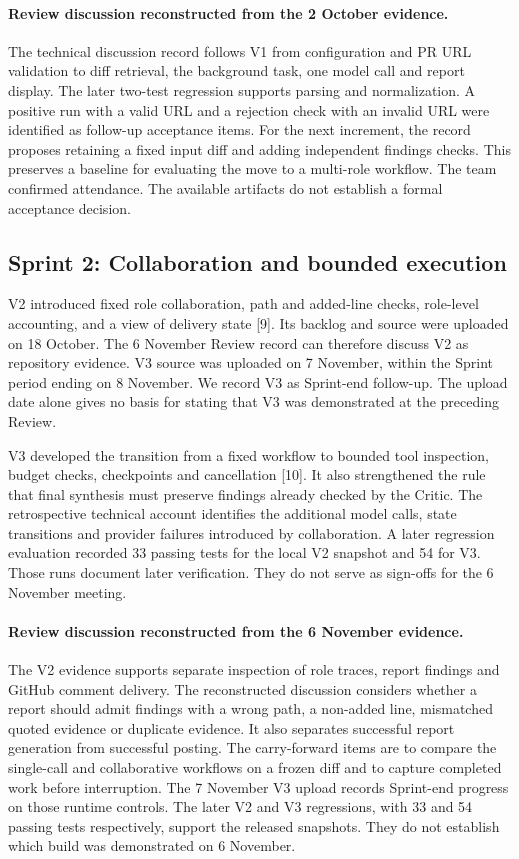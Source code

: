 \documentclass[journal,compsoc]{IEEEtran}
\begin{document}
\paragraph{Review discussion reconstructed from the 2 October evidence.}
The technical discussion record follows V1 from configuration and PR URL validation to diff retrieval, the background task, one model call and report display. The later two-test regression supports parsing and normalization. A positive run with a valid URL and a rejection check with an invalid URL were identified as follow-up acceptance items. For the next increment, the record proposes retaining a fixed input diff and adding independent findings checks. This preserves a baseline for evaluating the move to a multi-role workflow. The team confirmed attendance. The available artifacts do not establish a formal acceptance decision.

\subsection{Sprint 2: Collaboration and bounded execution}
V2 introduced fixed role collaboration, path and added-line checks, role-level accounting, and a view of delivery state [9]. Its backlog and source were uploaded on 18 October. The 6 November Review record can therefore discuss V2 as repository evidence. V3 source was uploaded on 7 November, within the Sprint period ending on 8 November. We record V3 as Sprint-end follow-up. The upload date alone gives no basis for stating that V3 was demonstrated at the preceding Review.

V3 developed the transition from a fixed workflow to bounded tool inspection, budget checks, checkpoints and cancellation [10]. It also strengthened the rule that final synthesis must preserve findings already checked by the Critic. The retrospective technical account identifies the additional model calls, state transitions and provider failures introduced by collaboration. A later regression evaluation recorded 33 passing tests for the local V2 snapshot and 54 for V3. Those runs document later verification. They do not serve as sign-offs for the 6 November meeting.

\paragraph{Review discussion reconstructed from the 6 November evidence.}
The V2 evidence supports separate inspection of role traces, report findings and GitHub comment delivery. The reconstructed discussion considers whether a report should admit findings with a wrong path, a non-added line, mismatched quoted evidence or duplicate evidence. It also separates successful report generation from successful posting. The carry-forward items are to compare the single-call and collaborative workflows on a frozen diff and to capture completed work before interruption. The 7 November V3 upload records Sprint-end progress on those runtime controls. The later V2 and V3 regressions, with 33 and 54 passing tests respectively, support the released snapshots. They do not establish which build was demonstrated on 6 November.
\end{document}
